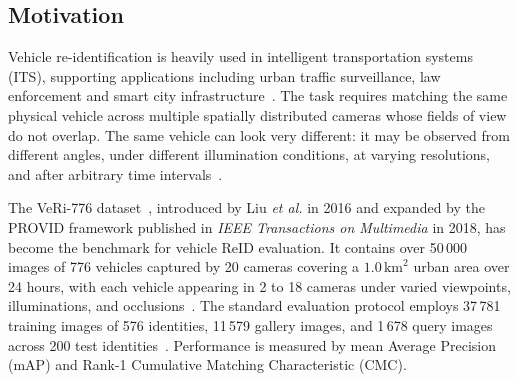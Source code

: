\subsection{Motivation}
Vehicle re-identification is heavily used in intelligent
transportation systems (ITS), supporting applications including urban traffic
surveillance, law enforcement and smart city infrastructure~\cite{liu2016veri,liu2018provid}.
The task requires matching the
same physical vehicle across multiple spatially distributed cameras whose
fields of view do not overlap. The same vehicle can look very different: it may be observed from different angles, under
different illumination conditions, at varying resolutions, and after arbitrary
time intervals~\cite{liu2016veri}.

The VeRi-776 dataset~\cite{liu2016veri,liu2018provid}, introduced by Liu
\emph{et al.} in 2016 and expanded by the PROVID framework published
in \emph{IEEE Transactions on Multimedia} in 2018, has become the
benchmark for vehicle ReID evaluation. It contains over 50\,000 images of 776
vehicles captured by 20 cameras covering a $1.0\,\text{km}^{2}$ urban area over
24 hours, with each vehicle appearing in 2 to 18 cameras under varied
viewpoints, illuminations, and occlusions~\cite{liu2016veri,liu2018provid}. The
standard evaluation protocol employs 37\,781 training images of 576
identities, 11\,579 gallery images, and 1\,678 query images across 200 test
identities~\cite{liu2018provid}. Performance is measured by mean Average
Precision (mAP) and Rank-1 Cumulative Matching Characteristic (CMC).
